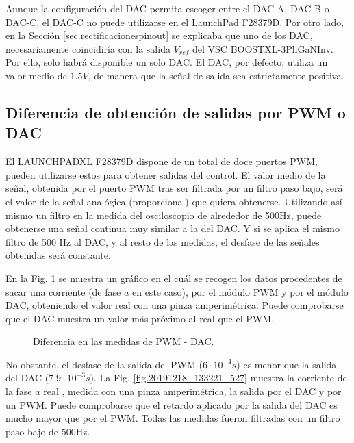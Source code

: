 \documentclass{report}
\begin{document}
Aunque la configuración del DAC permita escoger entre el DAC-A, DAC-B o DAC-C, el DAC-C no puede utilizarse en el LaunchPad F28379D. Por otro lado, en la Sección \ref{sec.rectificacionespinout} se explicaba que uno de los DAC, necesariamente coincidiría con la salida $V_{ref}$ del VSC BOOSTXL-3PhGaNInv. Por ello, solo habrá disponible un solo DAC.
El DAC, por defecto, utiliza un valor medio de $1.5V$, de manera que la señal de salida sea estrictamente positiva.

\subsection{Diferencia de obtención de salidas por PWM o DAC} \label{sec.diferenciaspwmdac}

El LAUNCHPADXL F28379D dispone de un total de doce puertos PWM, pueden utilizarse estos para obtener salidas del control. El valor medio de la señal, obtenida por el puerto PWM tras ser filtrada por un filtro paso bajo, será el valor de la señal analógica (proporcional) que quiera obtenerse. Utilizando así mismo un filtro en la medida del osciloscopio de alrededor de 500Hz, puede obtenerse una señal continua muy similar a la del DAC. Y si se aplica el mismo filtro de 500 Hz al DAC, y al resto de las medidas, el desfase de las señales obtenidas será constante.

En la Fig. \ref{fig.excelpwmdac} se muestra un gráfico en el cuál se recogen los datos procedentes de sacar una corriente (de fase $a$ en este caso), por el módulo PWM y por el módulo DAC, obteniendo el valor real con una pinza amperimétrica. Puede comprobarse que el DAC muestra un valor más próximo al real que el PWM.


\begin{figure}[!h]
    \begin{center}
    \caption{Diferencia en las medidas de PWM - DAC.}
    \label{fig.excelpwmdac} 
    \end{center}
\end{figure}

No obstante, el desfase de la salida del PWM ($6 \cdot 10^{-4}s$) es menor que la salida del DAC ($7.9 \cdot 10^{-3}s$). La Fig. \ref{fig.20191218_133221_527} muestra la corriente de la fase $a$ real , medida con una pinza amperimétrica, la salida por el DAC y por un PWM. Puede comprobarse que el retardo aplicado por la salida del DAC es mucho mayor que por el PWM. Todas las medidas fueron filtradas con un filtro paso bajo de 500Hz.
\end{document}
